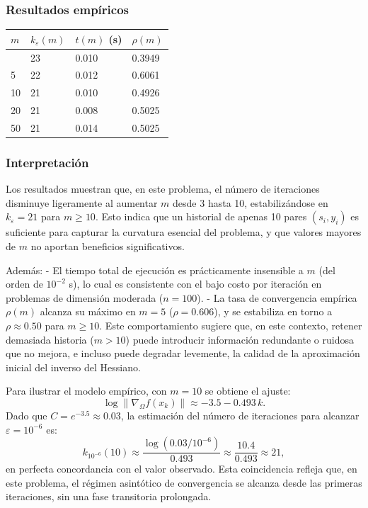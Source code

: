 \documentclass[
  spanish,
  us-letterpaper,
  DIV=11,
  numbers=noendperiod]{scrreprt}
\numberwithin{equation}{section}
\begin{document}
\subsubsection{Resultados empíricos}\label{resultados-empuxedricos}

\begin{longtable}[]{@{}llll@{}}
\toprule\noalign{}
\(m\) & \(k_{\varepsilon}(m)\) & \(t(m)\) (s) & \(\rho(m)\) \\
\midrule\noalign{}
\endhead
\bottomrule\noalign{}
\endlastfoot
3 & 23 & 0.010 & 0.3949 \\
5 & 22 & 0.012 & 0.6061 \\
10 & 21 & 0.010 & 0.4926 \\
20 & 21 & 0.008 & 0.5025 \\
50 & 21 & 0.014 & 0.5025 \\
\end{longtable}

\subsubsection{Interpretación}\label{interpretaciuxf3n}

Los resultados muestran que, en este problema, el número de iteraciones
disminuye ligeramente al aumentar \(m\) desde 3 hasta 10,
estabilizándose en \(k_\varepsilon = 21\) para \(m \geq 10\). Esto
indica que un historial de apenas 10 pares \((s_i, y_i)\) es suficiente
para capturar la curvatura esencial del problema, y que valores mayores
de \(m\) no aportan beneficios significativos.

Además: - El tiempo total de ejecución es prácticamente insensible a
\(m\) (del orden de \(10^{-2}\) s), lo cual es consistente con el bajo
costo por iteración en problemas de dimensión moderada (\(n = 100\)). -
La tasa de convergencia empírica \(\rho(m)\) alcanza su máximo en
\(m = 5\) (\(\rho = 0.606\)), y se estabiliza en torno a
\(\rho \approx 0.50\) para \(m \geq 10\). Este comportamiento sugiere
que, en este contexto, retener demasiada historia (\(m > 10\)) puede
introducir información redundante o ruidosa que no mejora, e incluso
puede degradar levemente, la calidad de la aproximación inicial del
inverso del Hessiano.

Para ilustrar el modelo empírico, con \(m = 10\) se obtiene el ajuste:
\[
\log \|\nabla_\Omega f(x_k)\| \approx -3.5 - 0.493\, k.
\] Dado que \(C = e^{-3.5} \approx 0.03\), la estimación del número de
iteraciones para alcanzar \(\varepsilon = 10^{-6}\) es: \[
k_{10^{-6}}(10) \approx \frac{\log(0.03 / 10^{-6})}{0.493} \approx \frac{10.4}{0.493} \approx 21,
\] en perfecta concordancia con el valor observado. Esta coincidencia
refleja que, en este problema, el régimen asintótico de convergencia se
alcanza desde las primeras iteraciones, sin una fase transitoria
prolongada.
\end{document}
